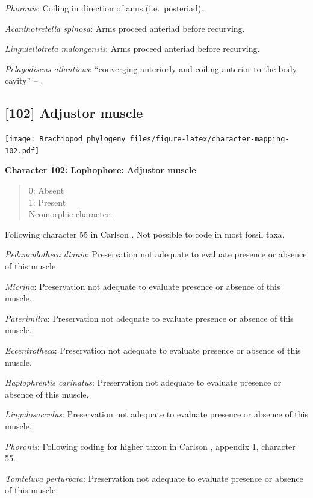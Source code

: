 \documentclass[]{book}
\theoremstyle{definition}
\theoremstyle{definition}
\theoremstyle{definition}
\theoremstyle{remark}
\begin{document}
\emph{Phoronis}: Coiling in direction of anus (i.e.~posteriad).

\emph{Acanthotretella spinosa}: Arms proceed anteriad before recurving.

\emph{Lingulellotreta malongensis}: Arms proceed anteriad before
recurving.

\emph{Pelagodiscus atlanticus}: ``converging anteriorly and coiling
anterior to the body cavity'' -- \citet{Zhang2009Architectureand}.

\hypertarget{adjustor-muscle}{%
\subsection*{{[}102{]} Adjustor muscle}\label{adjustor-muscle}}

\texttt{[image: Brachiopod\_phylogeny\_files/figure-latex/character-mapping-102.pdf]}

\textbf{Character 102: Lophophore: Adjustor muscle}

\begin{quote}
0: Absent\\
1: Present\\
Neomorphic character.
\end{quote}

Following character 55 in Carlson
\citeyearpar{Carlson1995Phylogeneticrelationships}. Not possible to code
in most fossil taxa.

\emph{Pedunculotheca diania}: Preservation not adequate to evaluate
presence or absence of this muscle.

\emph{Micrina}: Preservation not adequate to evaluate presence or
absence of this muscle.

\emph{Paterimitra}: Preservation not adequate to evaluate presence or
absence of this muscle.

\emph{Eccentrotheca}: Preservation not adequate to evaluate presence or
absence of this muscle.

\emph{Haplophrentis carinatus}: Preservation not adequate to evaluate
presence or absence of this muscle.

\emph{Lingulosacculus}: Preservation not adequate to evaluate presence
or absence of this muscle.

\emph{Phoronis}: Following coding for higher taxon in Carlson
\citeyearpar{Carlson1995Phylogeneticrelationships}, appendix 1,
character 55.

\emph{Tomteluva perturbata}: Preservation not adequate to evaluate
presence or absence of this muscle.
\end{document}
